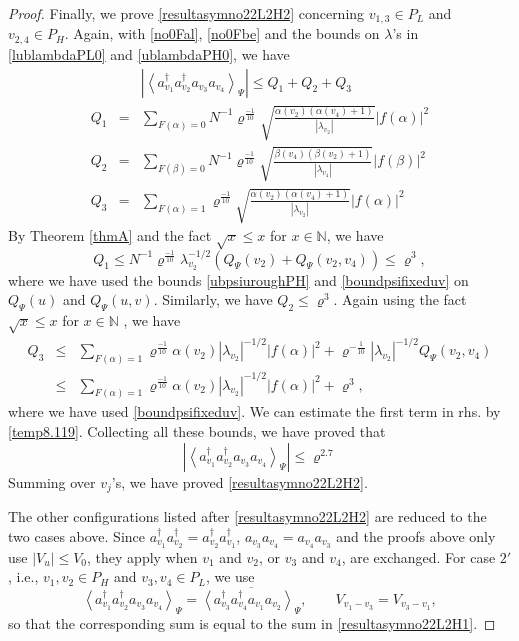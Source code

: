 \documentclass[11pt]{article}
\numberwithin{equation}{section}
\newcommand{\beq}{\begin{equation}}
\newcommand{\eeq}{\end{equation}}
\newcommand{\beqa}{\begin{eqnarray}}
\newcommand{\eeqa}{\end{eqnarray}}
\newcommand\N{{\mathbb N}}
\newcommand\al{{\alpha}}
\newcommand\be{\beta}
\renewcommand\rho\varrho
\theoremstyle{definition}
\begin{document}
\begin{proof}
Finally, we prove \eqref{resultasymno22L2H2} concerning  $v_{1,3}\in P_L$ and $v_{2,4}\in P_H$. Again, with \eqref{no0Fal}, \eqref{no0Fbe} and the bounds on $\lambda$'s in \eqref{lublambdaPL0} and \eqref{ublambdaPH0}, we have 
\beqa\label{temp8.128}
&&\left|\left\langle a_{v_1}^\dagger a_{v_2}^\dagger a_{v_3}a_{v_4}\right\rangle_{\Psi}\right|\leq 
Q_{1}+ Q_{2}+ Q_{3} \\
Q_{1} &= &\sum_{F(\al)= 0}N^{-1}\rho^{\frac{-1}{10}}\sqrt{\frac{\al(v_2)(\al(v_4)+1)}{\left|\lambda_{v_2}\right|}}|f(\al)|^2\\\nonumber
Q_{2}&=&\sum_{F(\be)= 0}N^{-1}\rho^{\frac{-1}{10}}\sqrt{\frac{\be(v_4)(\be(v_2)+1)}{\left|\lambda_{v_4}\right|}}|f(\be)|^2\\
Q_{3} & = & \sum_{F(\al)= 1}\rho^{\frac{-1}{10}}\sqrt{\frac{\al(v_2)(\al(v_4)+1)}{\left|\lambda_{v_2}\right|}}|f(\al)|^2
\eeqa 
By  Theorem \ref{thmA} and the fact $\sqrt{x}\leq x$ for $x\in\N$, we have 
$$
Q_{1}\le  N^{-1}\rho^{\frac{-1}{10}}\lambda_{v_2}^{-1/2}\left(Q_{\Psi}(v_2)+Q_{\Psi}(v_2,v_4)\right)
\le \rho^{3},
$$ 
where we have used the bounds \eqref{ubpsiuroughPH} and \eqref{boundpsifixeduv} on $Q_\Psi(u)$ and $Q_\Psi(u,v)$. Similarly,  we have  $Q_{2}\le \rho^3$.  
Again using the fact $\sqrt{x}\leq x$ for $x\in\N$ , we have 
\beqa\nonumber
Q_{3} & \le & \sum_{F(\al)= 1}\rho^{\frac{-1}{10}}\al(v_2)\left|\lambda_{v_2}\right|^{-1/2}|f(\al)|^2+\rho^{-\frac{1}{10}}\left|\lambda_{v_2}\right|^{-1/2}Q_{\Psi}(v_{2},v_{4}) \\
&\le & \sum_{F(\al)= 1}\rho^{\frac{-1}{10}}\al(v_2)\left|\lambda_{v_2}\right|^{-1/2}|f(\al)|^2+\rho^{3} , \nonumber
\eeqa
where we have used  \eqref{boundpsifixeduv}.
We can estimate the first term in rhs. by  \eqref{temp8.119}. Collecting all these bounds, we have proved that 
\beq
\left|\left\langle a_{v_1}^\dagger a_{v_2}^\dagger a_{v_3}a_{v_4}\right\rangle_{\Psi}\right| \leq \rho^{2.7}
\eeq
Summing over $v_{j}$'s, we have proved  \eqref{resultasymno22L2H2}.

The other configurations listed after \eqref{resultasymno22L2H2} are reduced to the two cases above. Since $a^\dagger_{v_1}a^\dagger_{v_2}=a^\dagger_{v_2}a^\dagger_{v_1}$, $a_{v_3}a_{v_4}=a_{v_4}a_{v_3}$ and the proofs above only use $|V_u|\leq V_0$, they apply when $v_1$ and $v_2$, or $v_3$ and $v_4$, are exchanged. For case $2'$, i.e., $v_1,v_2\in P_H$ and $v_3,v_4\in P_L$, we use
\[
\left\langle a_{v_1}^\dagger a_{v_2}^\dagger a_{v_3}a_{v_4}\right\rangle_{\Psi}=\overline{\left\langle a_{v_3}^\dagger a_{v_4}^\dagger a_{v_1}a_{v_2}\right\rangle_{\Psi}}, \qquad V_{v_1-v_3}=V_{v_3-v_1},
\]
so that the corresponding sum is equal to the sum in \eqref{resultasymno22L2H1}.
\end{proof}
\end{document}
